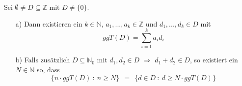 \label{Teiler als Linearkombi}
Sei $\emptyset \neq D \subseteq \mathbb{Z}$ mit $D \neq \lbrace 0 \rbrace$.
\begin{itemize}
\item[a)] Dann existieren ein $k \in \mathbb{N}$, $a_{1},...,a_{k} \in \mathbb{Z}$ und $d_{1},...,d_{k} \in D$ mit
\begin{equation*}
ggT(D) = \sum_{i=1}^{k} a_{i} d_{i}
\end{equation*} 
\item[b)] Falls zusätzlich $D \subseteq \mathbb{N}_{0}$ mit $d_{1},d_{2} \in D$ $\Rightarrow$ $d_{1} + d_{2} \in D$, so existiert ein $N \in \mathbb{N}$ so, dass
\begin{equation*}
\lbrace n \cdot ggT(D) \: : \: n \geq N \rbrace \: \: = \: \: \lbrace d \in D \: : \: d \geq N \cdot ggT(D) \rbrace
\end{equation*}
\end{itemize}